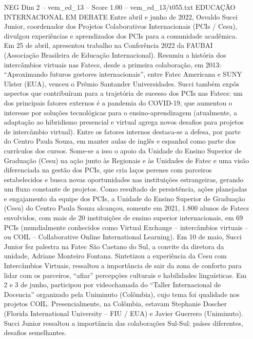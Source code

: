 \begin{textsample}{NEG Dim 2 – vem\_ed\_13 – Score 1.00 – vem\_ed\_13/t055.txt}  \label{ex:f2_neg_054}
EDUCAÇÃO INTERNACIONAL EM DEBATE Entre abril e junho de 2022, Osvaldo Succi Junior, coordenador dos Projetos Colaborativos Internacionais (PCIs / Cesu), divulgou experiências e aprendizados dos PCIs para a comunidade acadêmica.
Em 25 de abril, apresentou trabalho na Conferência 2022 da FAUBAI (Associação Brasileira de Educação Internacional).
Resumiu a história dos intercâmbios virtuais nas Fatecs, desde a primeira colaboração, em 2013: “Aproximando futuros gestores internacionais”, entre Fatec Americana e SUNY Ulster (EUA), venceu o Prêmio Santander Universidades.
Succi também expôs aspectos que contribuíram para a trajetória de sucesso dos PCIs nas Fatecs: um dos principais fatores externos é a pandemia do COVID-19, que aumentou o interesse por soluções tecnológicas para o ensino-aprendizagem (atualmente, a adaptação ao hibridismo presencial e virtual agrega novos desafios para projetos de intercâmbio virtual).
Entre os fatores internos destaca-se a defesa, por parte do Centro Paula Souza, em manter aulas de inglês e espanhol como parte dos currículos dos cursos.
Some-se a isso o apoio da Unidade do Ensino Superior de Graduação (Cesu) na ação junto às Regionais e às Unidades de Fatec e uma visão diferenciada na gestão dos PCIs, que cria laços perenes com parceiros estabelecidos e busca novas oportunidades nas instituições estrangeiras, gerando um fluxo constante de projetos.
Como resultado de persistência, ações planejadas e engajamento da equipe dos PCIs, a Unidade do Ensino Superior de Graduação (Cesu) do Centro Paula Souza alcançou, somente em 2021, 1.800 alunos de Fatecs envolvidos, com mais de 20 instituições de ensino superior internacionais, em 69 PCIs (mundialmente conhecidos como Virtual Exchange – intercâmbios virtuais – ou COIL – Collaborative Online International Learning).
Em 10 de maio, Succi Junior fez palestra na Fatec São Caetano do Sul, a convite da diretora da unidade, Adriane Monteiro Fontana.
Sintetizou a experiência da Cesu com Intercâmbios Virtuais, ressaltou a importância de sair da zona de conforto para lidar com os parceiros, “afiar” percepções culturais e habilidades linguísticas.
Em 2 e 3 de junho, participou por videochamada do “Taller Internacional de Docencia” organizado pela Uniminuto (Colômbia), cujo tema foi qualidade nos projetos COIL.
Presencialmente, na Colômbia, estavam Stephanie Doscher (Florida International University – FIU / EUA) e Javier Guerrero (Uniminuto).
Succi Junior ressaltou a importância das colaborações Sul-Sul: países diferentes, desafios semelhantes.

\end{textsample}
